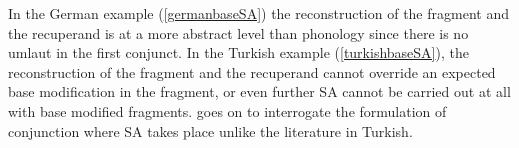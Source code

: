 In the German example (\ref{germanbaseSA}) the reconstruction of the fragment and the recuperand is at a more abstract level than phonology since there is no umlaut in the first conjunct. In the Turkish example (\ref{turkishbaseSA}), the reconstruction of the fragment and the recuperand cannot override an expected base modification in the fragment, or even further SA cannot be carried out at all with base modified fragments. \cite{pounder2006broken} goes on to interrogate the formulation of conjunction where SA takes place unlike the literature in Turkish.































